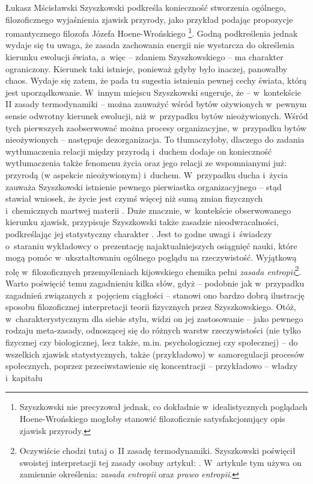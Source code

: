 \begin{artplenv}{Łukasz Mścisławski}
Szyszkowski podkreśla konieczność stworzenia ogólnego, filozoficznego wyjaśnienia zjawisk przyrody, jako przykład podając propozycje romantycznego filozofa Józefa Hoene-Wrońskiego
\parencite*[][k. 212r]{noauthor_noty_1917}%
\footnote{Szyszkowski nie precyzował jednak, co dokładnie w~idealistycznych poglądach Hoene-Wrońskiego mogłoby stanowić filozoficznie satysfakcjonujący opis zjawisk przyrody. }. Godną podkreślenia jednak wydaje się tu uwaga, że zasada zachowania energii nie wystarcza do określenia kierunku ewolucji świata, a~więc -- zdaniem Szyszkowskiego -- ma charakter ograniczony. Kierunek taki istnieje, ponieważ gdyby było inaczej, panowałby chaos. Wydaje się zatem, że pada tu sugestia istnienia pewnej cechy świata, którą jest uporządkowanie. W~innym miejscu Szyszkowski sugeruje, że -- w~kontekście II zasady termodynamiki -- można zauważyć wśród bytów ożywionych w~pewnym sensie odwrotny kierunek ewolucji, niż w~przypadku bytów nieożywionych. Wśród tych pierwszych zaobserwować można procesy organizacyjne, w~przypadku bytów nieożywionych -- następuje dezorganizacja. To tłumaczyłoby, dlaczego do zadania wytłumaczenia relacji między przyrodą i~duchem dodaje on konieczność wytłumaczenia także fenomenu życia oraz jego relacji ze wspomnianymi już: przyrodą (w aspekcie nieożywionym) i~duchem. W~przypadku ducha i~życia zauważa Szyszkowski istnienie pewnego pierwiastka organizacyjnego -- stąd stawiał wniosek, że życie jest czymś więcej niż sumą zmian fizycznych i~chemicznych martwej materii 
\parencite[][]{szyszkowski_entropja_1917}. %
 Duże znacznie, w~kontekście obserwowanego kierunku zjawisk, przypisuje Szyszkowski także zasadzie nieodwracalności, podkreślając jej statystyczny charakter 
\parencite[por. ][k. 217r]{noauthor_noty_1917}. %
 Jest to godne uwagi i~świadczy o~staraniu wykładowcy o~prezentację najaktualniejszych osiągnięć nauki, które mogą pomóc w~ukształtowaniu ogólnego poglądu na rzeczywistość. Wyjątkową rolę w~filozoficznych przemyśleniach kijowskiego chemika pełni \textit{zasada entropii}\footnote{Oczywiście chodzi tutaj o~II zasadę termodynamiki. Szyszkowski poświęcił swoistej interpretacji tej zasady osobny artykuł: 
\parencite[][]{szyszkowski_1909}. %
 W~artykule tym używa on zamiennie określenia: \textit{zasada entropii} oraz \textit{prawo entropii}.}. Warto poświęcić temu zagadnieniu kilka słów, gdyż -- podobnie jak w~przypadku zagadnień związanych z~pojęciem ciągłości -- stanowi ono bardzo dobrą ilustrację sposobu filozoficznej interpretacji teorii fizycznych przez Szyszkowskiego. Otóż, w~charakterystycznym dla siebie stylu, widzi on jej zastosowanie -- jako pewnego rodzaju meta-zasady, odnoszącej się do różnych warstw rzeczywistości (nie tylko fizycznej czy biologicznej, lecz także, m.in. psychologicznej czy społecznej) -- do wszelkich zjawisk statystycznych, także (przykładowo) w~samoregulacji procesów społecznych, poprzez przeciwstawienie się koncentracji -- przykładowo -- władzy i~kapitału 

\end{artplenv}
